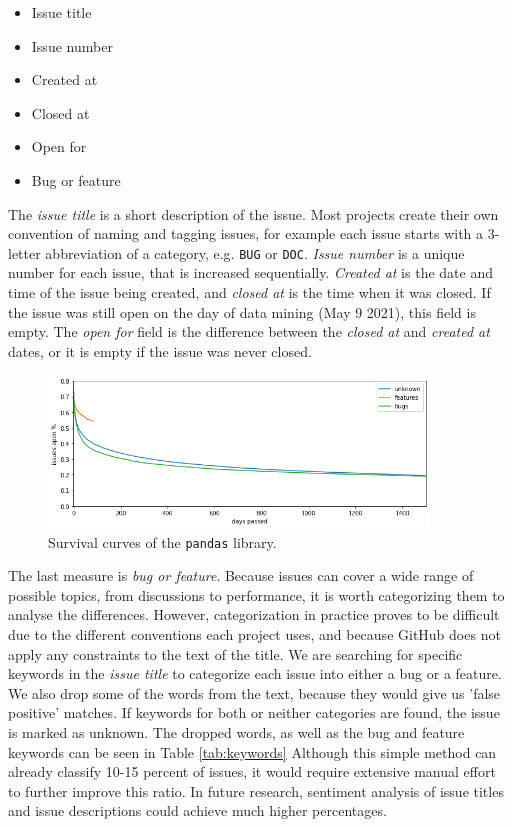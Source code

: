 \begin{itemize}
    \item Issue title
    \item Issue number
    \item Created at
    \item Closed at
    \item Open for
    \item Bug or feature
\end{itemize}

The \textit{issue title} is a short description of the issue. Most projects create their own convention of naming and tagging issues, for example each issue starts with a 3-letter abbreviation of a category, e.g. \texttt{BUG} or \texttt{DOC}. \textit{Issue number} is a unique number for each issue, that is increased sequentially. \textit{Created at} is the date and time of the issue being created, and \textit{closed at} is the time when it was closed. If the issue was still open on the day of data mining (May 9 2021), this field is empty. The \textit{open for} field is the difference between the \textit{closed at} and \textit{created at} dates, or it is empty if the issue was never closed.

\begin{figure}
    \centering
    \includegraphics[width=0.9\textwidth]{figures/issues_open.png}
    \caption{Survival curves of the \texttt{pandas} library.}
    \label{fig:survival}
\end{figure}

The last measure is \textit{bug or feature}. Because issues can cover a wide range of possible topics, from discussions to performance, it is worth categorizing them to analyse the differences. However, categorization in practice proves to be difficult due to the different conventions each project uses, and because GitHub does not apply any constraints to the text of the title. We are searching for specific keywords in the \textit{issue title} to categorize each issue into either a bug or a feature. We also drop some of the words from the text, because they would give us 'false positive' matches. If keywords for both or neither categories are found, the issue is marked as unknown. The dropped words, as well as the bug and feature keywords can be seen in Table \ref{tab:keywords} Although this simple method can already classify 10-15 percent of issues, it would require extensive manual effort to further improve this ratio. In future research, sentiment analysis of issue titles and issue descriptions could achieve much higher percentages.

